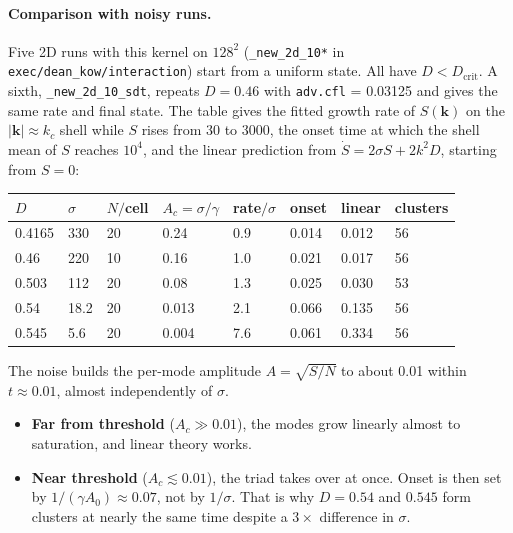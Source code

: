 \documentclass[11pt]{article}
\newcommand{\code}[1]{\texttt{#1}}
\begin{document}
\paragraph{Comparison with noisy runs.} Five 2D runs with this kernel on
$128^2$ (\code{\_new\_2d\_10*} in \code{exec/dean\_kow/interaction}) start
from a uniform state. All have $D<D_{\mathrm{crit}}$. A sixth,
\code{\_new\_2d\_10\_sdt}, repeats $D=0.46$ with \code{adv.cfl} = 0.03125 and
gives the same rate and final state. The table gives the
fitted growth rate of $S(\mathbf k)$ on the $|\mathbf k|\approx k_c$ shell
while $S$ rises from 30 to 3000, the onset time at which the shell mean of $S$
reaches $10^4$, and the linear prediction from
$\dot S = 2\sigma S + 2k^2D$, starting from $S=0$:
\begin{center}
\begin{tabular}{@{}llllllll@{}}
\toprule
$D$ & $\sigma$ & $N/$cell & $A_c=\sigma/\gamma$ & rate$/\sigma$ & onset & linear & clusters \\
\midrule
0.4165 & 330 & 20 & 0.24 & 0.9 & 0.014 & 0.012 & 56 \\
0.46 & 220 & 10 & 0.16 & 1.0 & 0.021 & 0.017 & 56 \\
0.503 & 112 & 20 & 0.08 & 1.3 & 0.025 & 0.030 & 53 \\
0.54 & 18.2 & 20 & 0.013 & 2.1 & 0.066 & 0.135 & 56 \\
0.545 & 5.6 & 20 & 0.004 & 7.6 & 0.061 & 0.334 & 56 \\
\bottomrule
\end{tabular}
\end{center}
The noise builds the per-mode amplitude $A=\sqrt{S/N}$ to about 0.01 within
$t\approx0.01$, almost independently of $\sigma$.
\begin{itemize}
  \item \textbf{Far from threshold} ($A_c \gg 0.01$), the modes grow linearly
        almost to saturation, and linear theory works.
  \item \textbf{Near threshold} ($A_c\lesssim0.01$), the triad takes over at
        once. Onset is then set by $1/(\gamma A_0)\approx0.07$, not by
        $1/\sigma$. That is why $D=0.54$ and $0.545$ form clusters at nearly
        the same time despite a $3\times$ difference in $\sigma$.
\end{itemize}
\end{document}
